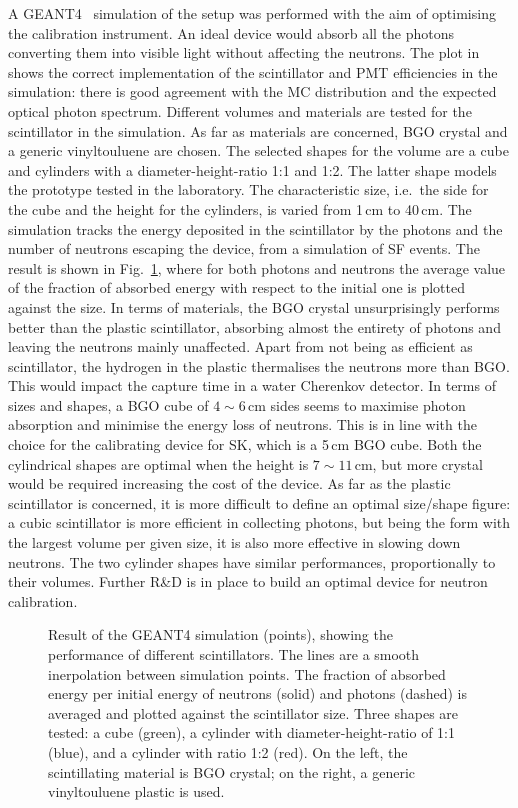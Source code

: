 A GEANT4~\cite{Agostinelli:2002hh} simulation of the setup was performed with the aim of optimising the calibration instrument.
An ideal device would absorb all the photons converting them into visible light without affecting the neutrons.
The plot in  shows the correct implementation of the scintillator and PMT efficiencies in the simulation: %
there is good agreement with the MC distribution and the expected optical photon spectrum.
Different volumes and materials are tested for the scintillator in the simulation.
As far as materials are concerned, BGO crystal and a generic vinyltouluene are chosen.
The selected shapes for the volume are a cube and cylinders with a diameter-height-ratio 1:1 and 1:2.
The latter shape models the prototype tested in the laboratory.
The characteristic size, i.e.\ the side for the cube and the height for the cylinders, is varied from 1\,cm to 40\,cm.
The simulation tracks the energy deposited in the scintillator by the photons and the number of neutrons escaping the device, %
from a simulation of  SF events.
The result is shown in Fig.~\ref{fig:geant4}, where for both photons and neutrons %
the average value of the fraction of absorbed energy with respect to the initial one is plotted against the size.
In terms of materials, the BGO crystal unsurprisingly performs better than the plastic scintillator, %
absorbing almost the entirety of photons and leaving the neutrons mainly unaffected.
Apart from not being as efficient as scintillator, the hydrogen in the plastic thermalises the neutrons more than BGO.
This would impact the capture time in a water Cherenkov detector.
In terms of sizes and shapes, a BGO cube of $4\sim6$\,cm sides seems to maximise photon absorption and minimise %
the energy loss of neutrons.
This is in line with the choice for the calibrating device for SK, which is a 5\,cm BGO cube.
Both the cylindrical shapes are optimal when the height is $7\sim11$\,cm, but more crystal would be required %
increasing the cost of the device.
As far as the plastic scintillator is concerned, it is more difficult to define an optimal size/shape figure:
a cubic scintillator is more efficient in collecting photons, but being the form with the largest volume %
per given size, it is also more effective in slowing down neutrons.
The two cylinder shapes have similar performances, proportionally to their volumes.
Further R\&D is in place to build an optimal device for neutron calibration.

\begin{figure}
	\centering
	\resizebox{0.9\textwidth}{!}{}
	\caption{Result of the GEANT4 simulation (points), showing the performance of different scintillators.
		The lines are a smooth inerpolation between simulation points.
		The fraction of absorbed energy per initial energy of neutrons (solid) and photons (dashed) %
		is averaged and plotted against the scintillator size.
		Three shapes are tested: a cube (green), a cylinder with diameter-height-ratio of 1:1 (blue), %
		and a cylinder with ratio 1:2 (red).
		On the left, the scintillating material is BGO crystal; on the right, %
		a generic vinyltouluene plastic is used.}
	\label{fig:geant4}
\end{figure}


